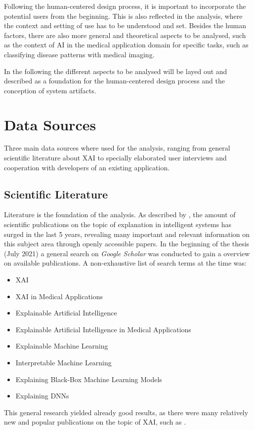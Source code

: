\documentclass[11pt,a4paper,english]{scrreprt}
\begin{document}
Following the human-centered design process, it is important to incorporate the potential users from the beginning. This is also reflected in the analysis, where the context and setting of use has to be understood and set. Besides the human factors, there are also more general and theoretical aspects to be analysed, such as the context of AI in the medical application domain for specific tasks, such as classifying disease patterns with medical imaging.

In the following the different aspects to be analysed will be layed out and described as a foundation for the human-centered design process and the conception of system artifacts.

\section{Data Sources}
Three main data sources where used for the analysis, ranging from general scientific literature about XAI to specially elaborated user interviews and cooperation with developers of an existing application.

\subsection{Scientific Literature}
Literature is the foundation of the analysis. As described by \textcite{mueller_explanation_2019}, the amount of scientific publications on the topic of explanation in intelligent systems has surged in the last 5 years, revealing many important and relevant information on this subject area through openly accessible papers. In the beginning of the thesis (July 2021) a general search on \textit{Google Scholar} was conducted to gain a overview on available publications. A non-exhaustive list of search terms at the time was:
\begin{itemize}
    \item XAI
    \item XAI in Medical Applications
    \item Explainable Artificial Intelligence
    \item Explainable Artificial Intelligence in Medical Applications
    \item Explainable Machine Learning
    \item Interpretable Machine Learning
    \item Explaining Black-Box Machine Learning Models
    \item Explaining DNNs
\end{itemize}
This general research yielded already good results, as there were many relatively new and popular publications on the topic of XAI, such as \textcite{mueller_explanation_2019, ras_explanation_2018, adadi_blackbox_2018, hoffman_metrics_2019}.
\end{document}

